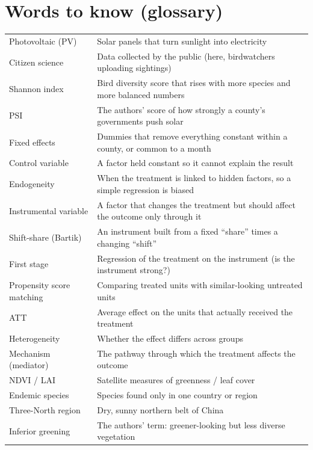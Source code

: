 \documentclass[11pt]{article}
\begin{document}
\section{Words to know (glossary)}
\begin{table}[H]\centering\small
\begin{tabularx}{\linewidth}{l>{\raggedright\arraybackslash}X}
\toprule
Photovoltaic (PV) & Solar panels that turn sunlight into electricity\\
Citizen science & Data collected by the public (here, birdwatchers uploading sightings)\\
Shannon index & Bird diversity score that rises with more species and more balanced numbers\\
PSI & The authors' score of how strongly a county's governments push solar\\
Fixed effects & Dummies that remove everything constant within a county, or common to a month\\
Control variable & A factor held constant so it cannot explain the result\\
Endogeneity & When the treatment is linked to hidden factors, so a simple regression is biased\\
Instrumental variable & A factor that changes the treatment but should affect the outcome only through it\\
Shift-share (Bartik) & An instrument built from a fixed ``share'' times a changing ``shift''\\
First stage & Regression of the treatment on the instrument (is the instrument strong?)\\
Propensity score matching & Comparing treated units with similar-looking untreated units\\
ATT & Average effect on the units that actually received the treatment\\
Heterogeneity & Whether the effect differs across groups\\
Mechanism (mediator) & The pathway through which the treatment affects the outcome\\
NDVI / LAI & Satellite measures of greenness / leaf cover\\
Endemic species & Species found only in one country or region\\
Three-North region & Dry, sunny northern belt of China\\
Inferior greening & The authors' term: greener-looking but less diverse vegetation\\
\bottomrule
\end{tabularx}
\end{table}
\end{document}
